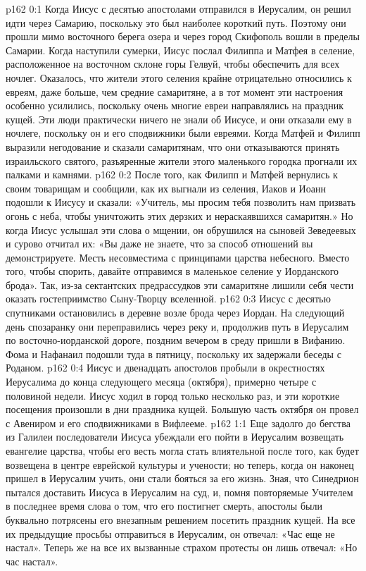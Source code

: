 \author{Комиссия срединников}
\vs p162 0:1 Когда Иисус с десятью апостолами отправился в Иерусалим, он решил идти через Самарию, поскольку это был наиболее короткий путь. Поэтому они прошли мимо восточного берега озера и через город Скифополь вошли в пределы Самарии. Когда наступили сумерки, Иисус послал Филиппа и Матфея в селение, расположенное на восточном склоне горы Гелвуй, чтобы обеспечить для всех ночлег. Оказалось, что жители этого селения крайне отрицательно относились к евреям, даже больше, чем средние самаритяне, а в тот момент эти настроения особенно усилились, поскольку очень многие евреи направлялись на праздник кущей. Эти люди практически ничего не знали об Иисусе, и они отказали ему в ночлеге, поскольку он и его сподвижники были евреями. Когда Матфей и Филипп выразили негодование и сказали самаритянам, что они отказываются принять израильского святого, разъяренные жители этого маленького городка прогнали их палками и камнями.
\vs p162 0:2 После того, как Филипп и Матфей вернулись к своим товарищам и сообщили, как их выгнали из селения, Иаков и Иоанн подошли к Иисусу и сказали: «Учитель, мы просим тебя позволить нам призвать огонь с неба, чтобы уничтожить этих дерзких и нераскаявшихся самаритян.» Но когда Иисус услышал эти слова о мщении, он обрушился на сыновей Зеведеевых и сурово отчитал их: «Вы даже не знаете, что за способ отношений вы демонстрируете. Месть несовместима с принципами царства небесного. Вместо того, чтобы спорить, давайте отправимся в маленькое селение у Иорданского брода». Так, из\hyp{}за сектантских предрассудков эти самаритяне лишили себя чести оказать гостеприимство Сыну\hyp{}Творцу вселенной.
\vs p162 0:3 Иисус с десятью спутниками остановились в деревне возле брода через Иордан. На следующий день спозаранку они переправились через реку и, продолжив путь в Иерусалим по восточно\hyp{}иорданской дороге, поздним вечером в среду пришли в Вифанию. Фома и Нафанаил подошли туда в пятницу, поскольку их задержали беседы с Роданом.
\vs p162 0:4 \pc Иисус и двенадцать апостолов пробыли в окрестностях Иерусалима до конца следующего месяца (октября), примерно четыре с половиной недели. Иисус ходил в город только несколько раз, и эти короткие посещения произошли в дни праздника кущей. Большую часть октября он провел с Авениром и его сподвижниками в Вифлееме.
\vs p162 1:1 Еще задолго до бегства из Галилеи последователи Иисуса убеждали его пойти в Иерусалим возвещать евангелие царства, чтобы его весть могла стать влиятельной после того, как будет возвещена в центре еврейской культуры и учености; но теперь, когда он наконец пришел в Иерусалим учить, они стали бояться за его жизнь. Зная, что Синедрион пытался доставить Иисуса в Иерусалим на суд, и, помня повторяемые Учителем в последнее время слова о том, что его постигнет смерть, апостолы были буквально потрясены его внезапным решением посетить праздник кущей. На все их предыдущие просьбы отправиться в Иерусалим, он отвечал: «Час еще не настал». Теперь же на все их вызванные страхом протесты он лишь отвечал: «Но час настал».
